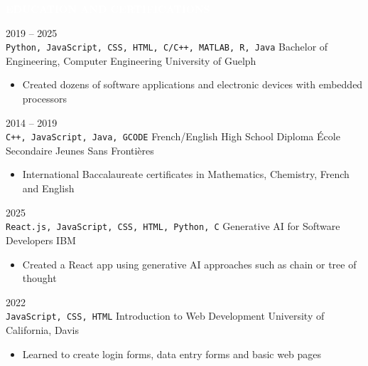 \documentclass[9pt]{src/developercv} %
\begin{document}
\pagebreak

\colorbox{sky800}{\textcolor{white}{\LARGE\MakeUppercase{\textbf{Education and Certifications}}}}\\%
\begin{entrylist}
	\entry
		{2019 -- 2025\\
		\small{\texttt{Python, JavaScript, CSS, HTML, C/C++, MATLAB, R, Java}}\hfill}
		{Bachelor of Engineering, Computer Engineering}
		{University of Guelph}
		{
			\vspace{-1.0\baselineskip}
			\begin{itemize}
				\item Created dozens of software applications and electronic devices with embedded processors
			\end{itemize}
		}
	\entry
		{2014 -- 2019\\
		\small{\texttt{C++, JavaScript, Java, GCODE}}\hfill}
		{French/English High School Diploma}
		{École Secondaire Jeunes Sans Frontières}
		{
			\vspace{-1.0\baselineskip}
			\begin{itemize}
				\item International Baccalaureate certificates in Mathematics, Chemistry, French and English
			\end{itemize}
		}
	\entry
		{2025\\
		\small{\texttt{React.js, JavaScript, CSS, HTML, Python, C}}\hfill}
		{Generative AI for Software Developers}
		{IBM}
		{
			\vspace{-1.0\baselineskip}
			\begin{itemize}
				\item Created a React app using generative AI approaches such as chain or tree of thought
			\end{itemize}
		}
		
	\entry
		{2022\\
		\small{\texttt{JavaScript, CSS, HTML}}\hfill}
		{Introduction to Web Development}
		{University of California, Davis}
		{
			\vspace{-1.0\baselineskip}
			\begin{itemize}
				\item Learned to create login forms, data entry forms and basic web pages
			\end{itemize}
		}
\end{entrylist}
\end{document}
